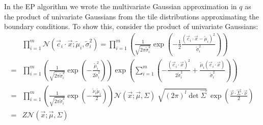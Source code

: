 \documentclass[11pt,twoside]{report}
\begin{document}
In the EP algorithm we wrote the multivariate Gaussian approximation in $q$ as the product of univariate Gaussians from the tile distributions approximating the boundary conditions.
To show this, consider the product of univariate Gaussians:
\begin{align}
    &
    \prod_{i=1}^m
    \mathcal{N}(\vec{c}_i \cdot \vec{x}; \widetilde{\mu}_i, \widetilde{\sigma}_i^2)
    =
    \prod_{i=1}^m
    \left(
    \frac{1}{\sqrt{ 2\pi \widetilde{\sigma}_i^2 }}
    \exp{\left(
      - \frac{1}{2} \frac{(\vec{c}_i \cdot \vec{x} - \widetilde{\mu}_i)^2}{\widetilde{\sigma}_i^2}
      \right)}
    \right)
    \nonumber \\ =&
    \prod_{i=1}^m
    \left(
    \frac{1}{\sqrt{ 2\pi \widetilde{\sigma}_i^2 }}
    \exp{\left(-\frac{\widetilde{\mu}_i^2}{2\widetilde{\sigma}_i^2}\right)}
    \right)
    \exp{\left( \sum_{i=1}^m \left(
      - \frac{(\vec{c}_i \cdot \vec{x})^2}{2\widetilde{\sigma}_i^2}
      + \frac{\widetilde{\mu}_i(\vec{c}_i \cdot \vec{x})}{\widetilde{\sigma}_i^2}
      \right) \right)}
    \nonumber \\ =&
    \prod_{i=1}^m
    \left(
    \frac{1}{\sqrt{ 2\pi \widetilde{\sigma}_i^2 }}
    \exp{\left(-\frac{\widetilde{\nu}_i \widetilde{\mu}_i}{2}\right)}
    \right)
    \mathcal{N}(\vec{x}; \vec{\mu}, \Sigma)
    \;
    \sqrt{ (2\pi)^l \det{\vec{\Sigma}} }
    \;
    \exp{\left( \frac{\vec{\nu} \cdot \vec{\Sigma} \cdot \vec{\nu}}{2} \right)}
    \nonumber \\ =&
    Z \mathcal{N}(\vec{x}; \vec{\mu}, \Sigma)
  \label{eq:combined-normals}
\end{align}
\end{document}
